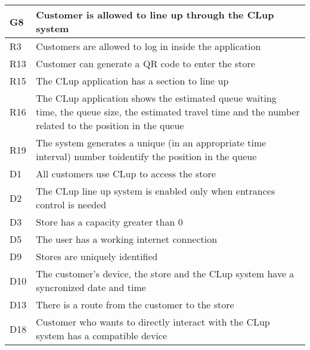 \begin{center}
    {\renewcommand{\arraystretch}{1.5}
    \begin{longtable}{L{2cm}L{12cm}}
        \hline
        \textbf{G8} & \textbf{Customer is allowed to line up through the CLup system} \\
        \hline
         R3 & Customers are allowed to log in inside the application \\
        \hline
         R13 & Customer can generate a QR code to enter the store \\
        \hline
         R15 & The CLup application has a section to line up \\
        \hline
         R16 & The CLup application shows the estimated queue waiting time, the queue size, the estimated travel time and the number related to the position in the queue \\
        \hline
         R19 & The system generates a unique (in an appropriate time interval) number toidentify the position in the queue \\
        \hline
         D1 & All customers use CLup to access the store \\
        \hline
         D2 & The CLup line up system is enabled only when entrances control is needed \\
        \hline
         D3 & Store has a capacity greater than 0 \\
        \hline
         D5 & The user has a working internet connection \\
        \hline
         D9 & Stores are uniquely identified \\
        \hline
         D10 & The customer’s device, the store and the CLup system have a syncronized date and time \\
        \hline
         D13 & There is a route from the customer to the store \\
        \hline
         D18 & Customer who wants to directly interact with the CLup system has a compatible device \\
        \hline
    \end{longtable}}


\end{center}
